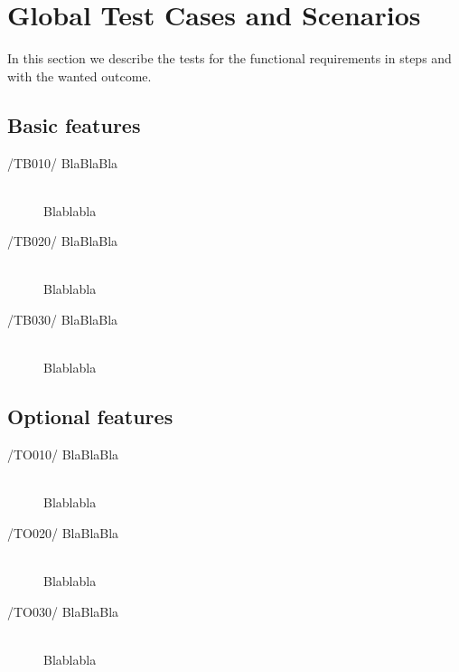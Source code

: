 \newpage
\section{Global Test Cases and Scenarios}

In this section we describe the tests for the functional requirements in steps and with the wanted outcome. 

\subsection{Basic features}
\begin{description}
\item[/TB010/ BlaBlaBla]\hfill \\ Blablabla
\item[/TB020/ BlaBlaBla]\hfill \\ Blablabla
\item[/TB030/ BlaBlaBla]\hfill \\ Blablabla
\end{description}

\subsection{Optional features}
\begin{description}
\item[/TO010/ BlaBlaBla]\hfill \\ Blablabla
\item[/TO020/ BlaBlaBla]\hfill \\ Blablabla
\item[/TO030/ BlaBlaBla]\hfill \\ Blablabla
\end{description}